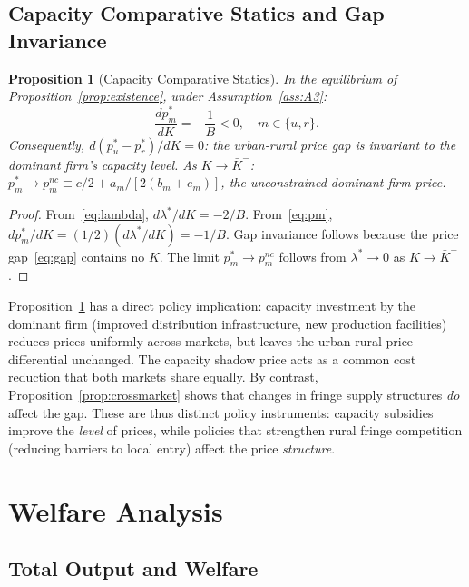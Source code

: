 \documentclass[12pt]{article}
\theoremstyle{plain}
\newtheorem{proposition}{Proposition}
\theoremstyle{definition}
\theoremstyle{remark}
\begin{document}
\subsection{Capacity Comparative Statics and Gap Invariance}

\begin{proposition}[Capacity Comparative Statics]
\label{prop:capacity}
In the equilibrium of Proposition~\ref{prop:existence}, under
Assumption~\ref{ass:A3}:
\begin{equation}
  \frac{dp_m^*}{dK} = -\frac{1}{B} < 0, \quad m \in \{u, r\}.
  \label{eq:dpdk}
\end{equation}
Consequently, $d(p_u^* - p_r^*)/dK = 0$: the urban-rural price gap is invariant
to the dominant firm's capacity level.  As $K \to \bar{K}^-$:
$p_m^* \to p_m^{nc} \equiv c/2 + a_m/[2(b_m + e_m)]$, the unconstrained
dominant firm price.
\end{proposition}

\begin{proof}
From~\eqref{eq:lambda}, $d\lambda^*/dK = -2/B$.  From~\eqref{eq:pm},
$dp_m^*/dK = (1/2)(d\lambda^*/dK) = -1/B$.  Gap invariance follows because
the price gap~\eqref{eq:gap} contains no $K$.  The limit $p_m^* \to p_m^{nc}$
follows from $\lambda^* \to 0$ as $K \to \bar{K}^-$.
\end{proof}

Proposition~\ref{prop:capacity} has a direct policy implication: capacity
investment by the dominant firm (improved distribution infrastructure, new
production facilities) reduces prices uniformly across markets, but leaves the
urban-rural price differential unchanged.  The capacity shadow price acts as a
common cost reduction that both markets share equally.  By contrast,
Proposition~\ref{prop:crossmarket} shows that changes in fringe supply structures
\emph{do} affect the gap.  These are thus distinct policy instruments: capacity
subsidies improve the \emph{level} of prices, while policies that strengthen rural
fringe competition (reducing barriers to local entry) affect the price
\emph{structure}.

\section{Welfare Analysis}
\label{sec:welfare}

\subsection{Total Output and Welfare}
\end{document}
